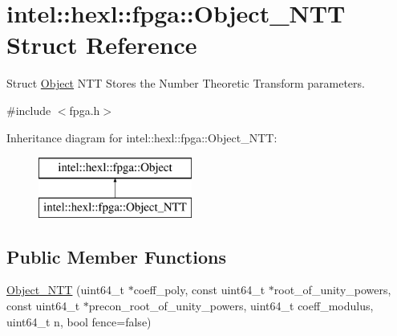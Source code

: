 \hypertarget{structintel_1_1hexl_1_1fpga_1_1Object__NTT}{\section{intel\-:\-:hexl\-:\-:fpga\-:\-:Object\-\_\-\-N\-T\-T Struct Reference}
\label{structintel_1_1hexl_1_1fpga_1_1Object__NTT}
}


Struct \hyperlink{structintel_1_1hexl_1_1fpga_1_1Object}{Object} N\-T\-T Stores the Number Theoretic Transform parameters.  




{\ttfamily \#include $<$fpga.\-h$>$}

Inheritance diagram for intel\-:\-:hexl\-:\-:fpga\-:\-:Object\-\_\-\-N\-T\-T\-:\begin{figure}[H]
\begin{center}
\leavevmode
\includegraphics[height=2.000000cm]{structintel_1_1hexl_1_1fpga_1_1Object__NTT}
\end{center}
\end{figure}
\subsection*{Public Member Functions}
\begin{DoxyCompactItemize}
\item 
\hyperlink{structintel_1_1hexl_1_1fpga_1_1Object__NTT_aba6073ea63919faf1fc1e0c2f8f10fb3}{Object\-\_\-\-N\-T\-T} (uint64\-\_\-t $\ast$coeff\-\_\-poly, const uint64\-\_\-t $\ast$root\-\_\-of\-\_\-unity\-\_\-powers, const uint64\-\_\-t $\ast$precon\-\_\-root\-\_\-of\-\_\-unity\-\_\-powers, uint64\-\_\-t coeff\-\_\-modulus, uint64\-\_\-t n, bool fence=false)
\end{DoxyCompactItemize}
